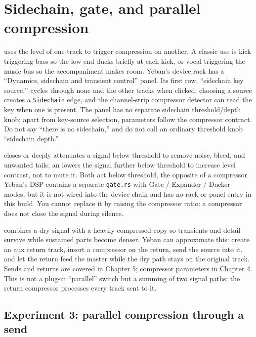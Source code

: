 \section{Sidechain, gate, and parallel compression}

 uses the level of one track to trigger compression on another. A classic use is kick triggering bass so the low end ducks briefly at each kick, or vocal triggering the music bus so the accompaniment makes room. Yeban's device rack has a ``Dynamics, sidechain and transient control'' panel. Its first row, ``sidechain key source,'' cycles through none and the other tracks when clicked; choosing a source creates a \texttt{Sidechain} edge, and the channel-strip compressor detector can read the key when one is present. The panel has no separate sidechain threshold/depth knob; apart from key-source selection, parameters follow the compressor contract. Do not say ``there is no sidechain,'' and do not call an ordinary threshold knob ``sidechain depth.''

 closes or deeply attenuates a signal below threshold to remove noise, bleed, and unwanted tails; an  lowers the signal further below threshold to increase level contrast, not to mute it. Both act below threshold, the opposite of a compressor. Yeban's DSP contains a separate \texttt{gate.rs} with Gate / Expander / Ducker modes, but it is not wired into the device chain and has no rack or panel entry in this build. You cannot replace it by raising the compressor ratio: a compressor does not close the signal during silence.

 combines a dry signal with a heavily compressed copy so transients and detail survive while sustained parts become denser. Yeban can approximate this: create an aux return track, insert a compressor on the return, send the source into it, and let the return feed the master while the dry path stays on the original track. Sends and returns are covered in Chapter 5; compressor parameters in Chapter 4. This is not a plug-in ``parallel'' switch but a summing of two signal paths; the return compressor processes every track sent to it.

\subsection{Experiment 3: parallel compression through a send}

